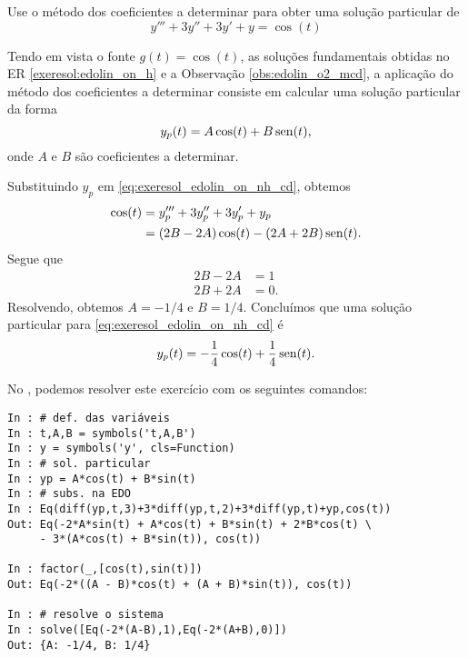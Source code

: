 \begin{exeresol}
  Use o método dos coeficientes a determinar para obter uma solução particular de
  \begin{equation}\label{eq:exeresol_edolin_on_nh_cd}
    y''' + 3y'' + 3y' + y = \cos(t)
  \end{equation}
\end{exeresol}
\begin{resol}
  Tendo em vista o fonte $g(t) = \cos(t)$, as soluções fundamentais obtidas no ER \ref{exeresol:edolin_on_h} e a Observação \ref{obs:edolin_o2_mcd}, a aplicação do método dos coeficientes a determinar consiste em calcular uma solução particular da forma
  \begin{equation}
    y_p(t) = A\cos(t) + B\operatorname{sen}(t),
  \end{equation}
  onde $A$ e $B$ são coeficientes a determinar.

  Substituindo $y_p$ em \eqref{eq:exeresol_edolin_on_nh_cd}, obtemos
  \begin{align}
    \cos(t) &= y_p''' + 3y_p'' + 3y_p' + y_p \\
            &= (2B-2A)\cos(t) - (2A + 2B)\operatorname{sen}(t).
  \end{align}
  Segue que
  \begin{align}
    2B - 2A &= 1 \\
    2B + 2A &= 0.
  \end{align}
  Resolvendo, obtemos $A = -1/4$ e $B = 1/4$. Concluímos que uma solução particular para \eqref{eq:exeresol_edolin_on_nh_cd} é
  \begin{equation}
    y_p(t) = -\frac{1}{4}\cos(t) + \frac{1}{4}\operatorname{sen}(t).
  \end{equation}

  \ifispython
  No \python, podemos resolver este exercício com os seguintes comandos:
\begin{verbatim}
In : # def. das variáveis
In : t,A,B = symbols('t,A,B')
In : y = symbols('y', cls=Function)
In : # sol. particular
In : yp = A*cos(t) + B*sin(t)
In : # subs. na EDO
In : Eq(diff(yp,t,3)+3*diff(yp,t,2)+3*diff(yp,t)+yp,cos(t))
Out: Eq(-2*A*sin(t) + A*cos(t) + B*sin(t) + 2*B*cos(t) \
     - 3*(A*cos(t) + B*sin(t)), cos(t))

In : factor(_,[cos(t),sin(t)])
Out: Eq(-2*((A - B)*cos(t) + (A + B)*sin(t)), cos(t))

In : # resolve o sistema
In : solve([Eq(-2*(A-B),1),Eq(-2*(A+B),0)])
Out: {A: -1/4, B: 1/4}
\end{verbatim}
  \fi
\end{resol}

